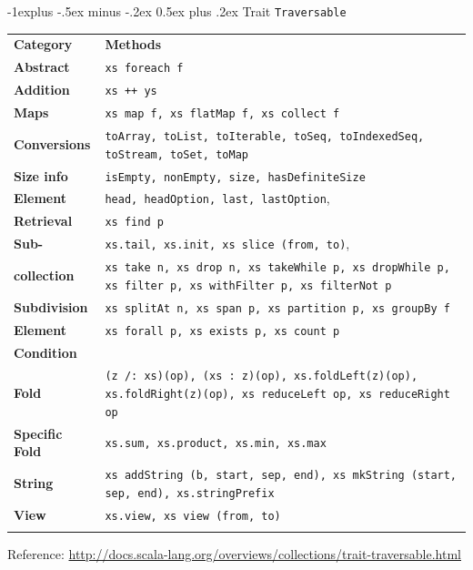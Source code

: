 \documentclass[a4paper,twoside,10pt,landscape]{article}
\makeatletter
\renewcommand{\subsection}{\@startsection{subsection}{2}{0mm}%
                                {-1explus -.5ex minus -.2ex}%
                                {0.5ex plus .2ex}%
                                {\normalfont\normalsize\bfseries}}
\makeatother
\begin{document}
\begin{multicols}{3}
\subsection{Trait \texttt{Traversable}}
\begin{center}
\begin{tabular}{@{}lp{6.5cm}@{}}
\hline\noalign{\smallskip}
\textbf{Category} & \textbf{Methods} \\
\noalign{\smallskip}\hline\noalign{\smallskip}
\textbf{Abstract} & \texttt{xs foreach f}\\
\textbf{Addition} & \texttt{xs ++ ys}\\
\textbf{Maps} & \texttt{xs map f, xs flatMap f, xs collect f}\\
\textbf{Conversions} & \texttt{toArray, toList, toIterable, toSeq, toIndexedSeq, toStream, toSet, toMap}\\
\textbf{Size info} & \texttt{isEmpty, nonEmpty, size, hasDefiniteSize}\\
\textbf{Element} & \texttt{head, headOption, last, lastOption},\\
\textbf{Retrieval} & \texttt{xs find p}\\
\textbf{Sub-} & \texttt{xs.tail, xs.init, xs slice (from, to)},\\
\textbf{collection} & \texttt{xs take n, xs drop n, xs takeWhile p, xs dropWhile p, xs filter p, xs withFilter p, xs filterNot p}\\
\textbf{Subdivision} & \texttt{xs splitAt n, xs span p, xs partition p, xs groupBy f}\\
\textbf{Element} & \texttt{xs forall p, xs exists p, xs count p}\\
\textbf{Condition} & \\
\textbf{Fold} & \texttt{(z /: xs)(op), (xs :\ z)(op), xs.foldLeft(z)(op), xs.foldRight(z)(op), xs reduceLeft op, xs reduceRight op}\\
\textbf{Specific Fold} & \texttt{xs.sum, xs.product, xs.min, xs.max}\\
\textbf{String} & \texttt{xs addString (b, start, sep, end), xs mkString (start, sep, end), xs.stringPrefix}\\
\textbf{View} & \texttt{xs.view, xs view (from, to)}\\
\noalign{\smallskip}\hline
\end{tabular}
\raggedright{\tiny{Reference: \url{http://docs.scala-lang.org/overviews/collections/trait-traversable.html}}}
\end{center}



\end{multicols}
\end{document}
